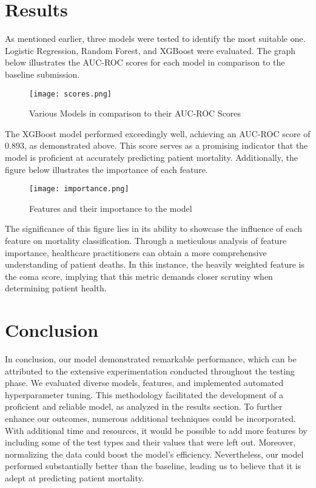 \documentclass{article}
\begin{document}
\section{Results}
\begin{flushleft} 

As mentioned earlier, three models were tested to identify the most suitable one.
Logistic Regression, Random Forest, and XGBoost were evaluated.
The graph below illustrates the AUC-ROC scores for each model in comparison to the baseline submission.

\begin{figure}[!ht]
    \centering
    \texttt{[image: scores.png]}
    \caption{Various Models in comparison to their AUC-ROC Scores}
\end{figure}

\clearpage
The XGBoost model performed exceedingly well, achieving an AUC-ROC score of 0.893, as demonstrated above.
This score serves as a promising indicator that the model is proficient at accurately predicting patient mortality.
Additionally, the figure below illustrates the importance of each feature.

\begin{figure}[!ht]
    \centering
    \texttt{[image: importance.png]}
    \caption{Features and their importance to the model}
\end{figure}

The significance of this figure lies in its ability to showcase the influence of each feature on mortality classification.
Through a meticulous analysis of feature importance, healthcare practitioners can obtain a more comprehensive understanding of patient deaths.
In this instance, the heavily weighted feature is the coma score, implying that this metric demands closer scrutiny when determining patient health.
\end{flushleft}
    
\section{Conclusion}

\begin{flushleft} 

In conclusion, our model demonstrated remarkable performance, which can be attributed to the extensive experimentation conducted throughout the testing phase.
We evaluated diverse models, features, and implemented automated hyperparameter tuning.
This methodology facilitated the development of a proficient and reliable model, as analyzed in the results section.
To further enhance our outcomes, numerous additional techniques could be incorporated.
With additional time and resources, it would be possible to add more features by including some of the test types and their values that were left out.
Moreover, normalizing the data could boost the model's efficiency.
Nevertheless, our model performed substantially better than the baseline, leading us to believe that it is adept at predicting patient mortality.

\end{flushleft}
    
\end{document}
